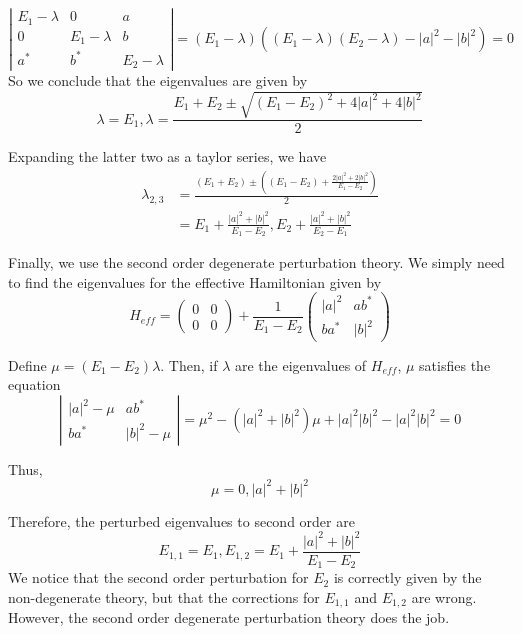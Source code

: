 \documentclass[12pt, letterpaper]{article}
\begin{document}
\begin{enumerate}
\begin{equation}
        \left|\begin{array}{ccc}E_1-\lambda &0&a\\0&E_1-\lambda&b\\a^*&b^*&E_2-\lambda\end{array}\right|=(E_1-\lambda)((E_1-\lambda)(E_2-\lambda)-|a|^2-|b|^2)=0
\end{equation}
So we conclude that the eigenvalues are given by
\begin{equation}
        \lambda=E_1,\lambda=\frac{E_1+E_2\pm \sqrt{(E_1-E_2)^2+4|a|^2+4|b|^2}}{2}
\end{equation}

Expanding the latter two as a taylor series, we have
\begin{align}
        \lambda_{2,3}&=\frac{(E_1+E_2)\pm \left((E_1-E_2)+\frac{2|a|^2+2|b|^2}{E_1-E_2}\right)}{2}\\&=E_1+\frac{|a|^2+|b|^2}{E_1-E_2},E_2+\frac{|a|^2+|b|^2}{E_2-E_1}
\end{align}

Finally, we use the second order degenerate perturbation theory. We simply need to find the eigenvalues for the effective Hamiltonian given by
\begin{equation}
        H_{eff}=\left(\begin{array}{cc}0&0\\0&0\end{array}\right)+\frac{1}{E_1-E_2}\left(\begin{array}{cc}|a|^2&ab^*\\ba^*&|b|^2\end{array}\right)
\end{equation}

Define $\mu=(E_1-E_2)\lambda$. Then, if $\lambda$ are the eigenvalues of $H_{eff}$, $\mu$ satisfies the equation
\begin{equation}
        \left|\begin{array}{cc}|a|^2-\mu&ab^*\\ba^*&|b|^2-\mu\end{array}\right|=\mu^2-(|a|^2+|b|^2)\mu+|a|^2|b|^2-|a|^2|b|^2=0
\end{equation}

Thus,
\begin{equation}
        \mu=0, |a|^2+|b|^2
\end{equation}

Therefore, the perturbed eigenvalues to second order are
\begin{equation}
        E_{1,1}=E_1,E_{1,2}=E_1+\frac{|a|^2+|b|^2}{E_1-E_2}
\end{equation}
We notice that the second order perturbation for $E_2$ is correctly given by the non-degenerate theory, but that the corrections for $E_{1,1}$ and $E_{1,2}$ are wrong. However, the second order degenerate perturbation theory does the job.


\end{enumerate}
\end{document}
